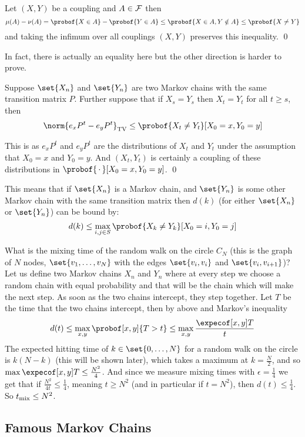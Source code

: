 \eprop

Let $(X,Y)$ be a coupling and $A\in{\cal F}$ then
$$ \mu(A) - \nu(A) = \probof{X\in A} - \probof{Y\in A} \leq \probof{X\in A,Y\notin A} \leq \probof{X\neq Y} $$
and taking the infimum over all couplings $(X,Y)$ preserves this inequality.
\qed

In fact, there is actually an equality here but the other direction is harder to prove.

\bthrm

    Suppose $\set{X_n}$ and $\set{Y_n}$ are two Markov chains with the same transition matrix $P$.
    Further suppose that if $X_s=Y_s$ then $X_t=Y_t$ for all $t\geq s$, then
    $$ \norm{e_xP^t-e_yP^t}_{\rm TV} \leq \probof{X_t\neq Y_t}[X_0=x,Y_0=y] $$

\ethrm

This is as $e_xP^t$ and $e_yP^t$ are the distributions of $X_t$ and $Y_t$ under the assumption that $X_0=x$ and $Y_0=y$.
And $(X_t,Y_t)$ is certainly a coupling of these distributions in $\probof{\,\cdot\,}[X_0=x,Y_0=y]$.
\qed

This means that if $\set{X_n}$ is a Markov chain, and $\set{Y_n}$ is some other Markov chain with the same transition matrix then $d(k)$ (for either $\set{X_n}$ or $\set{Y_n}$) can be bound by:
$$ d(k) \leq \max_{i,j\in S}\probof{X_k\neq Y_k}[X_0=i,Y_0=j] $$

\bexam

    What is the mixing time of the random walk on the circle $C_N$ (this is the graph of $N$ nodes, $\set{v_1,\dots,v_N}$ with the edges $\set{v_i,v_i}$ and $\set{v_i,v_{i+1}}$)?
    Let us define two Markov chains $X_n$ and $Y_n$ where at every step we choose a random chain with equal probability and that will be the chain which will make the next step.
    As soon as the two chains intercept, they step together.
    Let $T$ be the time that the two chains intercept, then by above and Markov's inequality
    $$ d(t) \leq \max_{x,y}\probof[x,y]{T>t} \leq \max_{x,y}\frac{\expecof[x,y]T}t $$
    The expected hitting time of $k\in\set{0,\dots,N}$ for a random walk on the circle is $k(N-k)$ (this will be shown later), which takes a maximum at $k=\frac N2$, and so
    $\max\expecof[x,y]T\leq\frac{N^2}4$.
    And since we measure mixing times with $\epsilon=\frac14$ we get that if $\frac{N^2}{4t}\leq\frac14$, meaning $t\geq N^2$ (and in particular if $t=N^2$), then $d(t)\leq\frac14$.
    So $t_{\rm mix}\leq N^2$.

\eexam

\subsection{Famous Markov Chains}


